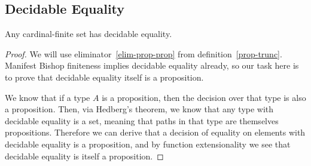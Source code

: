 \subsection{Decidable Equality}
\begin{rm-theorem} \label{cardinal-finite-discrete}
  Any cardinal-finite set has decidable equality.
\end{rm-theorem}
\begin{proof}
  We will use eliminator~\ref{elim-prop-prop} from definition~\ref{prop-trunc}.
  Manifest Bishop finiteness implies decidable equality already, so our task
  here is to prove that decidable equality itself is a proposition.

  We know that if a type \(A\) is a proposition, then the decision over that
  type is also a proposition.
  Then, via Hedberg's theorem, we know that any type with decidable equality is
  a set, meaning that paths in that type are themselves propositions.
  Therefore we can derive that a decision of equality on elements with decidable
  equality is a proposition, and by function extensionality we see that
  decidable equality is itself a proposition.
\end{proof}
